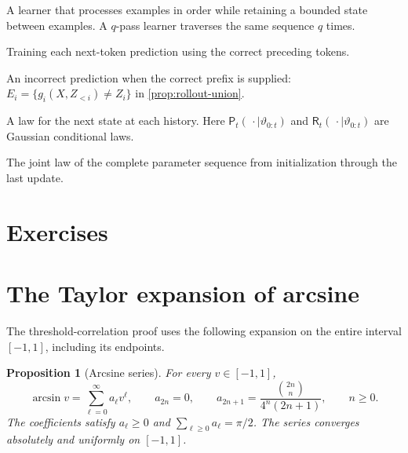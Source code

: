 \documentclass[11pt,twoside]{article}
\newtheorem{proposition}[theorem]{Proposition}
\theoremstyle{definition}
\theoremstyle{remark}
\renewcommand{\thesection}{8.\arabic{section}}
\begin{document}
\begin{description}[style=nextline,leftmargin=1.5em,labelindent=0pt]
\item[Streaming learner]
A learner that processes examples in order while retaining a bounded state
between examples. A $q$-pass learner traverses the same sequence $q$ times.
\item[Teacher forcing]
Training each next-token prediction using the correct preceding tokens.
\item[Teacher-forced error]
An incorrect prediction when the correct prefix is supplied:
$E_i=\{g_i(X,Z_{<i})\ne Z_i\}$ in \cref{prop:rollout-union}.
\item[Transition kernel]
A law for the next state at each history. Here
$\mathsf P_t(\,\cdot\mid\vartheta_{0:t})$
and $\mathsf R_t(\,\cdot\mid\vartheta_{0:t})$ are Gaussian conditional laws.
\item[Trajectory law]
The joint law of the complete parameter sequence from initialization through
the last update.
\end{description}

\section{Exercises}

\exerciseinstructions
\setcounter{courseexercise}{0}









\appendix
\renewcommand{\thesection}{8.\Alph{section}}
\section{The Taylor expansion of arcsine}
\label{app:arcsine-series}

The threshold-correlation proof uses the following expansion on the entire
interval $[-1,1]$, including its endpoints.

\begin{proposition}[Arcsine series]
For every $v\in[-1,1]$,
\[
\arcsin v=\sum_{\ell=0}^\infty a_\ell v^\ell,
\qquad
a_{2n}=0,\qquad
a_{2n+1}=\frac{\binom{2n}{n}}{4^n(2n+1)},\qquad n\ge0.
\]
The coefficients satisfy $a_\ell\ge0$ and
$\sum_{\ell\ge0}a_\ell=\pi/2$. The series converges absolutely and uniformly
on $[-1,1]$.
\end{proposition}
\end{document}
